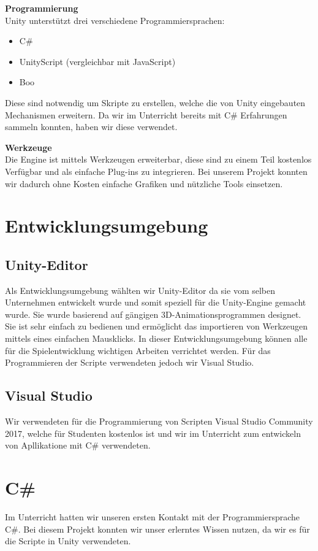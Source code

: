 \textbf{Programmierung}\\
Unity unterstützt drei verschiedene Programmiersprachen:
\begin{itemize}
	\item C\#
	\item UnityScript (vergleichbar mit JavaScript)
	\item Boo
\end{itemize}
Diese sind notwendig um Skripte zu erstellen, welche die von Unity eingebauten Mechanismen erweitern. Da wir im Unterricht bereits mit C\# Erfahrungen sammeln konnten, haben wir diese verwendet.

\textbf{Werkzeuge}\\
Die Engine ist mittels Werkzeugen erweiterbar, diese sind zu einem Teil kostenlos Verfügbar und als einfache Plug-ins zu integrieren. Bei unserem Projekt konnten wir dadurch ohne Kosten einfache Grafiken und nützliche Tools einsetzen.\\
\cite{Unity-Engine}

\section{Entwicklungsumgebung}
\subsection{Unity-Editor}
Als Entwicklungsumgebung wählten wir Unity-Editor da sie vom selben Unternehmen entwickelt wurde und somit speziell für die Unity-Engine gemacht wurde. Sie wurde basierend auf gängigen 3D-Animationsprogrammen designet. Sie ist sehr einfach zu bedienen und ermöglicht das importieren von Werkzeugen mittels eines einfachen Mausklicks. In dieser Entwicklungsumgebung können alle für die Spielentwicklung wichtigen Arbeiten verrichtet werden. Für das Programmieren der Scripte verwendeten jedoch wir Visual Studio. \cite{Unity-Engine}

\subsection{Visual Studio}
Wir verwendeten für die Programmierung von Scripten Visual Studio Community 2017, welche für Studenten kostenlos ist und wir im Unterricht zum entwickeln von Apllikatione mit C\#  verwendeten. 

\section{C\#}
Im Unterricht hatten wir unseren ersten Kontakt mit der Programmiersprache C\#. Bei diesem Projekt konnten wir unser erlerntes Wissen nutzen, da wir es für die Scripte in Unity verwendeten. 

